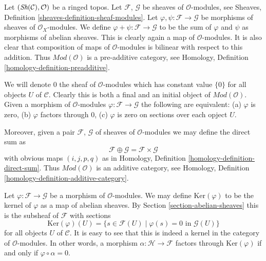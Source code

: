 \noindent
Let $(\mathop{\textit{Sh}}\nolimits(\mathcal{C}), \mathcal{O})$ be a ringed topos.
Let $\mathcal{F}$, $\mathcal{G}$ be sheaves of $\mathcal{O}$-modules, see
Sheaves, Definition \ref{sheaves-definition-sheaf-modules}.
Let $\varphi, \psi : \mathcal{F} \to \mathcal{G}$
be morphisms of sheaves of $\mathcal{O}_X$-modules.
We define $\varphi + \psi : \mathcal{F} \to \mathcal{G}$
to be the sum of $\varphi$ and $\psi$ as morphisms of abelian sheaves.
This is clearly again a map of $\mathcal{O}$-modules.
It is also clear that composition of maps of
$\mathcal{O}$-modules is bilinear with respect to this
addition. Thus $\textit{Mod}(\mathcal{O})$ is a pre-additive
category, see Homology, Definition \ref{homology-definition-preadditive}.

\medskip\noindent
We will denote $0$ the sheaf of $\mathcal{O}$-modules
which has constant value $\{0\}$ for all objects $U$ of $\mathcal{C}$.
Clearly this is both a final and an initial object of
$\textit{Mod}(\mathcal{O})$. Given a morphism
of $\mathcal{O}$-modules $\varphi : \mathcal{F} \to \mathcal{G}$
the following are equivalent:
(a) $\varphi$ is zero, (b) $\varphi$ factors through $0$,
(c) $\varphi$ is zero on sections over each opject $U$.

\medskip\noindent
Moreover, given a pair
$\mathcal{F}$, $\mathcal{G}$ of sheaves of $\mathcal{O}$-modules
we may define the direct sum as
$$
\mathcal{F} \oplus \mathcal{G} = \mathcal{F} \times \mathcal{G}
$$
with obvious maps $(i, j, p, q)$ as in Homology, Definition
\ref{homology-definition-direct-sum}. Thus $\textit{Mod}(\mathcal{O})$
is an additive category, see
Homology, Definition \ref{homology-definition-additive-category}.

\medskip\noindent
Let $\varphi : \mathcal{F} \to \mathcal{G}$ be a morphism
of $\mathcal{O}$-modules. We may define $\text{Ker}(\varphi)$
to be the kernel of $\varphi$ as a map of abelian sheaves.
By Section \ref{section-abelian-sheaves} this is the
subsheaf of $\mathcal{F}$ with sections
$$
\text{Ker}(\varphi)(U) =
\{ s \in \mathcal{F}(U) \mid \varphi(s) = 0 \text{ in } \mathcal{G}(U)\}
$$
for all objects $U$ of $\mathcal{C}$. It is easy to see that this is indeed
a kernel in the category of $\mathcal{O}$-modules. In other words,
a morphism $\alpha : \mathcal{H} \to \mathcal{F}$ factors
through $\text{Ker}(\varphi)$ if and only if $\varphi \circ \alpha = 0$.

